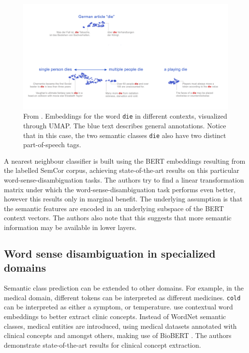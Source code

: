 \documentclass[a4paper,12pt,oneside,openright]{report}
\begin{document}
\begin{figure}[H]
	\center
  \includegraphics[width=0.9\linewidth]{./assets/relatedwork/BERT_plurality.png}
  \caption{From \cite{coenen19}. Embeddings for the word \texttt{die} in different contexts, visualized through UMAP. The blue text describes general annotations.
  Notice that in this case, the two semantic classes \texttt{die} also have two distinct part-of-speech tags.
  }
  \label{fig:BERT_plurality}
\end{figure}

A nearest neighbour classifier is built using the BERT embeddings resulting from the labelled SemCor corpus, achieving state-of-the-art results on this particular word-sense-disambiguation tasks.
The authors try to find a linear transformation matrix under which the word-sense-disambiguation task performs even better, however this results only in marginal benefit.
The underlying assumption is that the semantic features are encoded in an underlying subspace of the BERT context vectors.
The authors also note that this suggests that more semantic information may be available in lower layers. \\

\subsection{Word sense disambiguation in specialized domains}

Semantic class prediction can be extended to other domains. 
For example, in the medical domain, different tokens can be interpreted as different medicines. 
\texttt{cold} can be interpreted as either a symptom, or temperature.
\cite{si19} use contextual word embeddings to better extract clinic concepts. 
Instead of WordNet semantic classes, medical entities are introduced, using medical datasets annotated with clinical concepts and amongst others, making use of BioBERT \cite{lee19}.
The authors demonstrate state-of-the-art results for clinical concept extraction. \\
\end{document}
